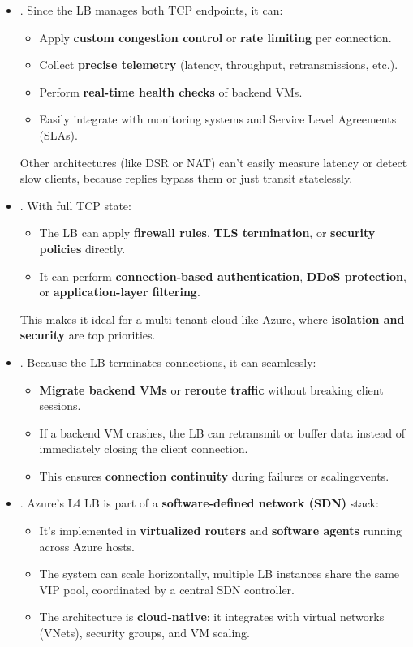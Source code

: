 \begin{itemize}
    \item {}. Since the LB manages both TCP endpoints, it can:
    \begin{itemize}
        \item Apply \textbf{custom congestion control} or \textbf{rate limiting} per connection.
        \item Collect \textbf{precise telemetry} (latency, throughput, retransmissions, etc.).
        \item Perform \textbf{real-time health checks} of backend VMs.
        \item Easily integrate with monitoring systems and Service Level Agreements (SLAs).
    \end{itemize}
    Other architectures (like DSR or NAT) can't easily measure latency or detect slow clients, because replies bypass them or just transit statelessly.

    \item {}. With full TCP state:
    \begin{itemize}
        \item The LB can apply \textbf{firewall rules}, \textbf{TLS termination}, or \textbf{security policies} directly.
        \item It can perform \textbf{connection-based authentication}, \textbf{DDoS protection}, or \textbf{application-layer filtering}.
    \end{itemize}
    This makes it ideal for a multi-tenant cloud like Azure, where \textbf{isolation and security} are top priorities.
    
    \item {}. Because the LB terminates connections, it can seamlessly:
    \begin{itemize}
        \item \textbf{Migrate backend VMs} or \textbf{reroute traffic} without breaking client sessions.
        \item If a backend VM crashes, the LB can retransmit or buffer data instead of immediately closing the client connection.
        \item This ensures \textbf{connection continuity} during failures or scaling\break events.
    \end{itemize}
    
    \item {}. Azure's L4 LB is part of a \textbf{software-defined network (SDN)} stack:
    \begin{itemize}
        \item It's implemented in \textbf{virtualized routers} and \textbf{software agents} running across Azure hosts.
        \item The system can scale horizontally, multiple LB instances share the same VIP pool, coordinated by a central SDN controller.
        \item The architecture is \textbf{cloud-native}: it integrates with virtual networks (VNets), security groups, and VM scaling.
    \end{itemize}
\end{itemize}
